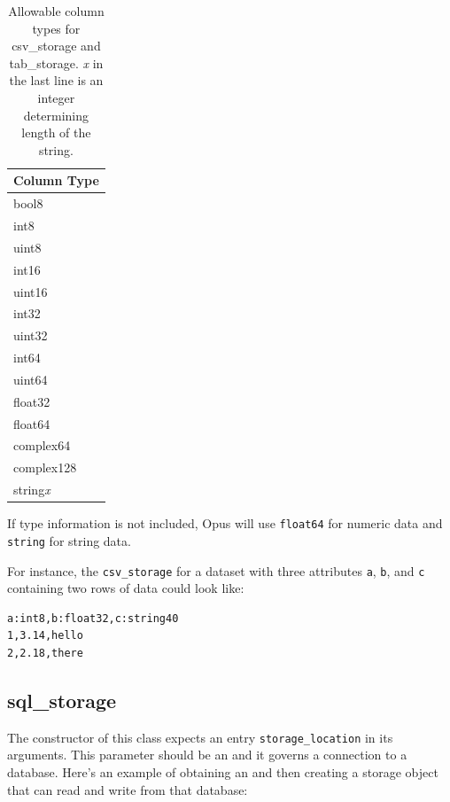 {\begin{table}
\begin{center}
\begin{tabular}{|l|}\hline
Column Type \\
\hline
bool8 \\
int8 \\
uint8 \\
int16 \\
uint16 \\
int32 \\
uint32 \\
int64 \\
uint64 \\
float32 \\
float64 \\
complex64 \\
complex128 \\
string{\it x}\\
\hline
\end{tabular}
\end{center}
\caption{\label{storage-numpy-python-mapping}Allowable column types
for csv_storage and tab_storage. 
{\it x} in the last line is an integer determining length of the string.}
\end{table}

If type information is not included, Opus will use \verb|float64| for numeric data
and \verb|string| for string data.

For instance, the \verb|csv_storage| for a dataset with three attributes
\verb|a|, \verb|b|, and \verb|c| containing two rows of data could look like:

\begin{verbatim}
a:int8,b:float32,c:string40
1,3.14,hello
2,2.18,there
\end{verbatim}



\subsection{sql_storage}
\label{sec:sql-storage}
%
The constructor of this class expects an entry \verb|storage_location| in its
arguments. This parameter should be an  and it governs a
connection to a database. Here's an example of obtaining an
 and then creating a storage object that can read and write from that database:

}
